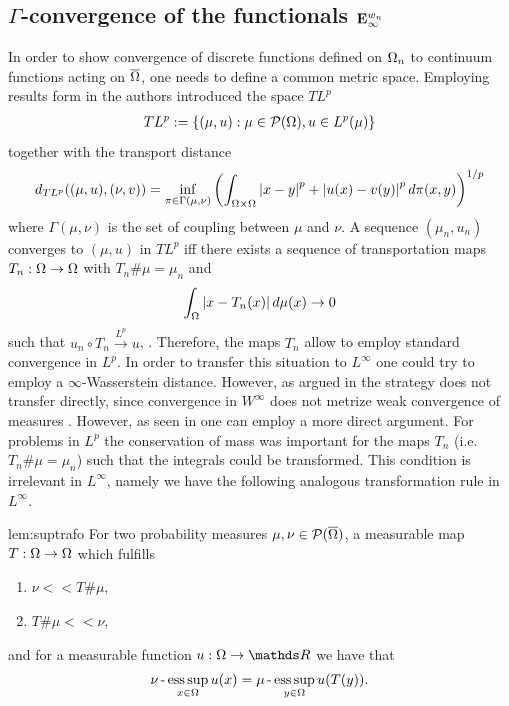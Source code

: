 \subsection{$\Gamma$-convergence of the functionals $\mathbf{E}^{w_n}_\infty$} In order to show convergence of discrete functions defined on $\Omega_n$ to continuum functions acting on $\overline{\Omega}$, one needs to define a common metric space. Employing results form \cite{trillos2015rate} in \cite{GarcSlep15} the authors introduced the space $TL^p$
%
\begin{align*}
TL^p :=\left\{(\mu, u): \mu\in \mathcal{P}(\Omega), u\in L^p(\mu)\right\}
\end{align*}
%
together with the transport distance
%
\begin{align*}
d_{TL^p}((\mu, u), (\nu, v)) = \inf_{\pi\in \Gamma(\mu,\nu)}
\left(\int_{\Omega\times\Omega} \left|x-y\right|^p + \left|u(x) - v(y)\right|^p d\pi(x,y)\right)^{1/p}
\end{align*}
%
where $\Gamma(\mu,\nu)$ is the set of coupling between $\mu$ and $\nu$. A sequence $(\mu_n, u_n)$ converges to $(\mu,u)$ in $TL^p$ iff there exists a sequence of transportation maps $T_n:\Omega\to\Omega$ with $T_n\#\mu = \mu_n$ and 
%
\begin{align*}
\int_{\Omega} \left|x- T_n(x)\right| d\mu(x)\rightarrow 0
\end{align*}
%
such that $u_n\circ T_n \xrightarrow{L^p} u$, \cite[Prop. 3.12]{GarcSlep15}. Therefore, the maps $T_n$ allow to employ standard convergence in $L^p$. In order to transfer this situation to $L^\infty$ one could try to employ a $\infty$-Wasserstein distance. However, as argued in \cite{roith2022msc} the strategy does not transfer directly, since convergence in $W^\infty$ does not metrize weak convergence of measures \cite[Thm. 5.10]{santambrogio2015optimal}. However, as seen in \cite{roith2022continuum} one can employ a more direct argument. For problems in $L^p$ the conservation of mass was important for the maps $T_n$ (i.e. $T_n\#\mu = \mu_n$) such that the integrals could be transformed. This condition is irrelevant in $L^\infty$, namely we have the following analogous transformation rule in $L^\infty$.
%
\begin{lemma}{\cite[Lem. 2]{roith2022continuum}}{lem:suptrafo}
For two probability measures $\mu,\nu \in \mathcal{P}(\overline{\Omega})$, a measurable map 
$T:\Omega\rightarrow\Omega$ which fulfills
\begin{enumerate}[label=\upshape(\roman*)]
\item $\nu<<T\#\mu$,
\item $T\# \mu<<\nu$,
\end{enumerate}
and for a measurable function $u:\domain\rightarrow\R$ we have that
\begin{align*}
\nu\operatorname{-}\operatorname*{ess\,sup}_{x\in\Omega} u(x) = \mu\operatorname{-}\operatorname*{ess\,sup}_{y\in\Omega} u(T(y)).
\end{align*}
\end{lemma}
